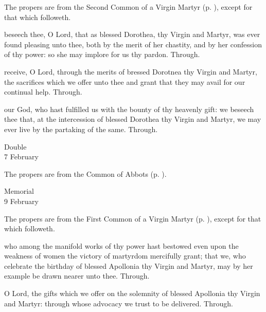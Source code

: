 \begin{rubric}
	The propers are from the Second Common of a Virgin Martyr (p. \pageref{CommonVirginMartyrII}), except for that which followeth.
\end{rubric}

\collect
{} beseech thee, O Lord, that as blessed Dorothea, thy Virgin and Martyr, was ever found pleasing unto thee, both by the merit of her chastity, and by her confession of thy power: so she may implore for us thy pardon. Through.

\secret
{} receive, O Lord, through the merits of bressed Dorotnea thy Virgin and Martyr, the sacrifices which we offer unto thee and grant that they may avail for our continual help. Through.

\postcommunion
{} our God, who hast fulfilled us with the bounty of thy heavenly gift: we beseech thee that, at the intercession of blessed Dorothea thy Virgin and Martyr, we may ever live by the partaking of the same. Through.


\begin{inhead}
    {Double\\
7 February}
\end{inhead}

\begin{rubric}
	The propers are from the Common of Abbots (p. \pageref{CommonAbbots}).
\end{rubric}


\begin{inhead}
    {Memorial\\
9 February}
\end{inhead}

\begin{rubric}
	The propers are from the First Common of a Virgin Martyr (p. \pageref{CommonVirginMartyrI}), except for that which followeth.
\end{rubric}

\collect
{} who among the manifold works of thy power hast bestowed even upon the weakness of women the victory of martyrdom mercifully grant; that we, who celebrate the birthday of blessed Apollonia thy Virgin and Martyr, may by her example be drawn nearer unto thee. Through.

\secret
{} O Lord, the gifts which we offer on the solemnity of blessed Apollonia thy Virgin and Martyr: through whose advocacy we trust to be delivered. Through.

